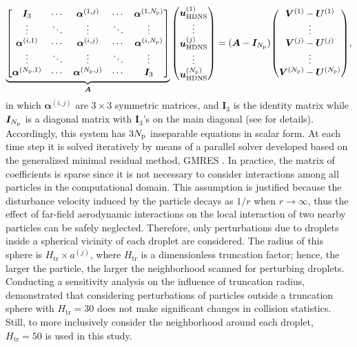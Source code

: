 \documentclass[../thesis.tex]{subfiles}
\begin{document}
\begin{equation}
\underbrace{
{\begin{bmatrix}
{\boldsymbol I_3} & \cdots & {\boldsymbol \alpha^{(1,j)}} & \cdots &{\boldsymbol \alpha^{(1,N_{\text p})}} \\
\vdots &\ddots &\vdots &\ddots &\vdots \\
{\boldsymbol \alpha^{(i,1)}} & \cdots & {\boldsymbol \alpha^{(i,j)}} & \cdots &{\boldsymbol \alpha^{(i,N_{\text p})}}\\\vdots &\ddots &\vdots &\ddots &\vdots \\
{\boldsymbol \alpha^{(N_{\text p},1)}} & \cdots & {\boldsymbol \alpha^{(N_{\text p},j)}} & \cdots &{\boldsymbol I_3}
\end{bmatrix}}}_{\boldsymbol A}
{\begin{pmatrix}
\boldsymbol{u}_\text{HDNS}^{(1)}\\\vdots\\\boldsymbol{u}_\text{HDNS}^{(j)}\\\vdots\\\boldsymbol{u}_\text{HDNS}^{(N_{\text p})}\end{pmatrix}}
= (\boldsymbol A - \boldsymbol I_{N_{\text p}})
{\begin{pmatrix}\boldsymbol{V}^{(1)}-\boldsymbol{U}^{(1)}\\\vdots\\\boldsymbol{V}^{(j)}-\boldsymbol{U}^{(j)}\\\vdots\\\boldsymbol{V}^{(N_{\text p})}-\boldsymbol{U}^{(N_{\text p})}
\end{pmatrix}}
\label{eq:7},
\end{equation}
in which ${\boldsymbol \alpha^{(i,j)}}$ are $3\times3$ symmetric matrices, and $\boldsymbol I_3$ is the identity matrix while $\boldsymbol I_{N_{\text p}}$ is a diagonal matrix with $\boldsymbol I_3$'s on the main diagonal (see \citet{TPARW13} for details). Accordingly, this system has $3N_{\text p}$ inseparable equations in scalar form. At each time step it is solved iteratively by means of a parallel solver developed based on the generalized minimal residual method, GMRES \citep{TPARW13}. In practice, the matrix of coefficients is sparse since it is not necessary to consider interactions among all particles in the computational domain. This assumption is justified because the disturbance velocity induced by the particle decays as $1/r$ when $r\to\infty$, thus the effect of far-field aerodynamic interactions on the local interaction of two nearby particles can be safely neglected. Therefore, only perturbations due to droplets inside a spherical vicinity of each droplet are considered. The radius of this sphere is $H_{\text{tr}}\times a^{(j)}$, where $H_{\text{tr}}$ is a dimensionless truncation factor; hence, the larger the particle, the larger the neighborhood scanned for perturbing droplets. Conducting a sensitivity analysis on the influence of truncation radius, \citet{AGW07} demonstrated that considering perturbations of particles outside a truncation sphere with $H_{\text{tr}}=30$ does not make significant changes in collision statistics. Still, to more inclusively consider the neighborhood around each droplet, $H_{\text{tr}}=50$ is used in this study.
\end{document}
